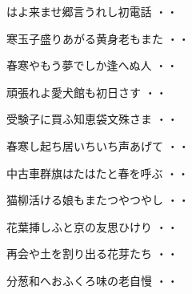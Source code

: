 \begin{shiika}はよ来ませ郷言うれし初電話
\hfill{・・}\end{shiika}
\vspace{0.6cm}
\begin{shiika}寒玉子盛りあがる黄身老もまた
\hfill{・・}\end{shiika}
\vspace{0.6cm}
\begin{shiika}春寒やもう夢でしか逢へぬ人
\hfill{・・}\end{shiika}
\vspace{0.6cm}
\begin{shiika}頑張れよ愛犬館も初日さす
\hfill{・・}\end{shiika}
\vspace{0.6cm}
\begin{shiika}受験子に買ふ知恵袋文殊さま
\hfill{・・}\end{shiika}
\vspace{0.6cm}
\begin{shiika}春寒し起ち居いちいち声あげて
\hfill{・・}\end{shiika}
\vspace{0.6cm}
\begin{shiika}中古車群旗はたはたと春を呼ぶ
\hfill{・・}\end{shiika}
\vspace{0.6cm}
\begin{shiika}猫柳活ける娘もまたつやつやし
\hfill{・・}\end{shiika}
\vspace{0.6cm}
\begin{shiika}花葉挿しふと京の友思ひけり
\hfill{・・}\end{shiika}
\vspace{0.6cm}
\begin{shiika}再会や土を割り出る花芽たち
\hfill{・・}\end{shiika}
\vspace{0.6cm}
\begin{shiika}分葱和へおふくろ味の老自慢
\hfill{・・}\end{shiika}
\vspace{0.6cm}
